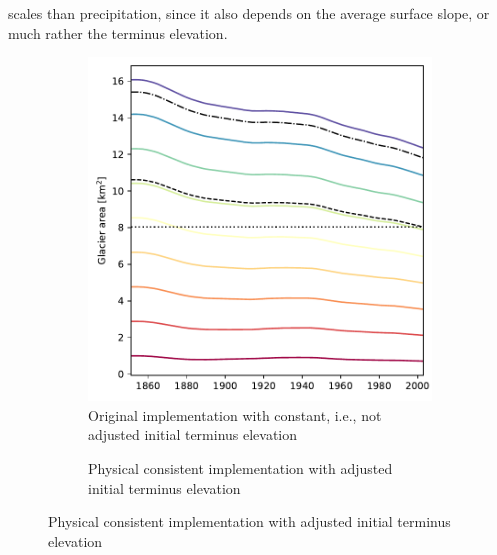 scales than precipitation, since it also depends on the average surface slope, or much rather the terminus elevation.

    \begin{figure}[ht]
      \centering

      \begin{subfigure}[b]{0.3\textwidth}
        \caption{Original implementation with constant, i.e., not adjusted initial terminus elevation}
        \label{fig:start_area:original}
        \centering
        \includegraphics[width=\textwidth]{../plots/start_area/RGI60-11.00897_original.pdf}
      \end{subfigure}
      \hfill
      \begin{subfigure}[b]{0.3\textwidth}
        \caption{Physical consistent implementation with adjusted initial terminus elevation}
        \label{fig:start_area:overturn}
        \centering

\end{subfigure}
\end{figure}
